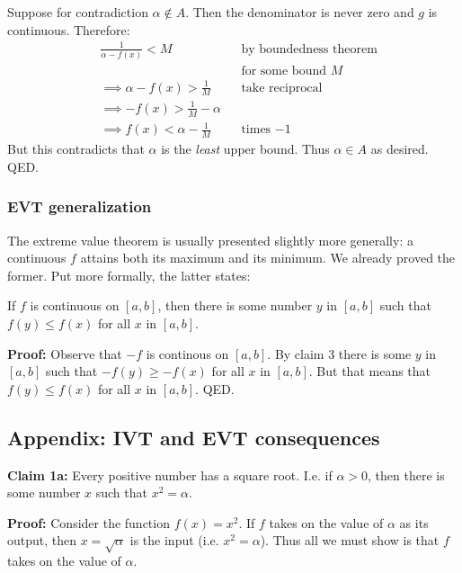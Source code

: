 Suppose for contradiction $\alpha\notin A$. Then the denominator is never zero
and $g$ is continuous. Therefore:
\begin{align*}
&\frac{1}{\alpha-f(x)}<M&&\text{by boundedness theorem}\\
& &&\text{for some bound $M$}\\
&\implies \alpha-f(x)>\frac{1}{M}&&\text{take reciprocal}\\
&\implies -f(x)>\frac{1}{M}-\alpha\\
&\implies f(x)<\alpha-\frac{1}{M}&&\text{times $-1$}
\end{align*}
But this contradicts that $\alpha$ is the \textit{least} upper bound. Thus
$\alpha\in A$ as desired. QED.

\subsubsection*{EVT generalization}

The extreme value theorem is usually presented slightly more
generally: a continuous $f$ attains both its maximum and its minimum.
We already proved the former. Put more formally, the latter states:

\vs

If $f$ is continuous on $[a,b]$, then there is some number $y$ in
$[a,b]$ such that $f(y)\leq f(x)$ for all $x$ in $[a,b]$.

\vs

\textbf{Proof:} Observe that $-f$ is continous on $[a,b]$. By claim 3
there is some $y$ in $[a,b]$ such that $-f(y)\geq-f(x)$ for all $x$ in
$[a,b]$. But that means that $f(y)\leq f(x)$ for all $x$ in $[a,b]$. QED.


\subsection{Appendix: IVT and EVT consequences}

\textbf{Claim 1a:} Every positive number has a square root. I.e. if
$\alpha>0$, then there is some number $x$ such that $x^{2}=\alpha$.

\vs

\textbf{Proof:} Consider the function $f(x)=x^{2}$. If $f$ takes on
the value of $\alpha$ as its output, then $x=\sqrt{\alpha}$ is the input (i.e.
$x^{2}=\alpha$). Thus all we must show is that $f$ takes on the value of
$\alpha$.

\vs

